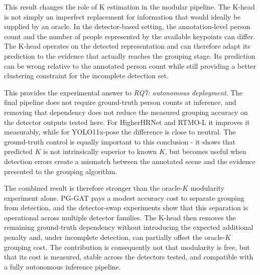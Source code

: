 This result changes the role of K estimation in the modular pipeline.
The K-head is not simply an imperfect replacement for information that
would ideally be supplied by an oracle.
In the detector-based setting,
the annotation-level person count and the number of people represented
by the available keypoints can differ.
The K-head operates on the detected representation and can therefore
adapt its prediction to the evidence that actually reaches the grouping
stage.
Its prediction can be wrong relative to the annotated person count
while still providing a better clustering constraint for the incomplete
detection set.

This provides the experimental answer to \emph{RQ7: autonomous
deployment}.
The final pipeline does not require ground-truth person counts at
inference,
and removing that dependency does not reduce the measured grouping
accuracy on the detector outputs tested here.
For HigherHRNet and RTMO-L it improves it measurably,
while for YOLO11x-pose the difference is close to neutral.
The ground-truth control is equally important to this conclusion -
it shows that predicted $K$ is not intrinsically superior to known $K$,
but becomes useful when detection errors create a mismatch between the
annotated scene and the evidence presented to the grouping algorithm.

The combined result is therefore stronger than the oracle-$K$
modularity experiment alone.
PG-GAT pays a modest accuracy cost to separate grouping from detection,
and the detector-swap experiments show that this separation is
operational across multiple detector families.
The K-head then removes the remaining ground-truth dependency without
introducing the expected additional penalty and,
under incomplete detection, can partially offset the oracle-$K$
grouping cost.
The contribution is consequently not that modularity is free,
but that its cost is measured,
stable across the detectors tested,
and compatible with a fully autonomous inference pipeline.